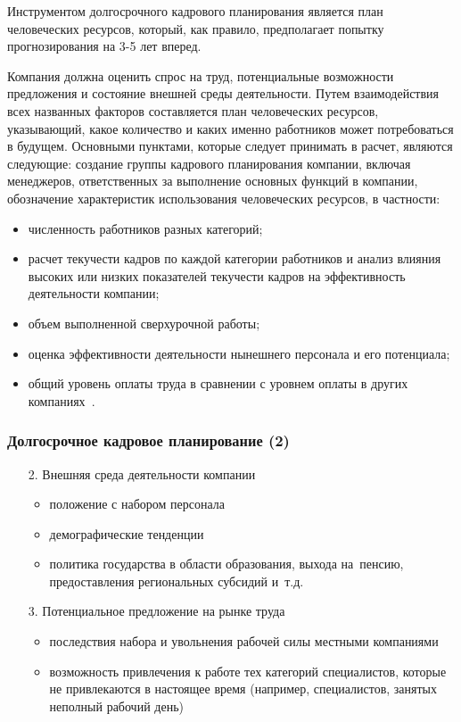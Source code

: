 \documentclass{../industrial-development}
\begin{document}
	\lecturenotes
	
	Инструментом долгосрочного кадрового планирования является план человеческих ресурсов, который, как правило, предполагает попытку прогнозирования на 3-5 лет вперед.
	
	Компания должна оценить спрос на труд, потенциальные возможности предложения и состояние внешней среды деятельности. Путем взаимодействия всех названных факторов составляется план человеческих ресурсов, указывающий, какое количество и
	каких именно работников может потребоваться в будущем. Основными пунктами, которые следует принимать в расчет, являются следующие: создание группы кадрового планирования компании, включая менеджеров, ответственных за выполнение основных функций в компании, обозначение характеристик использования человеческих ресурсов, в частности:
	\begin{itemize}
		\item численность работников разных категорий;
		\item расчет текучести кадров по каждой категории работников и анализ влияния высоких
		или низких показателей текучести кадров на эффективность деятельности компании;
		\item объем выполненной сверхурочной работы;
		\item оценка эффективности деятельности нынешнего персонала и его потенциала;
		\item общий уровень оплаты труда в сравнении с уровнем оплаты в других компаниях~\cite[с.~86]{Ivanova}.
	\end{itemize}
	
	\begin{frame} \frametitle{Долгосрочное кадровое планирование (2)}
		\begin{itemize}
			\item[2.] Внешняя среда деятельности компании
			\begin{itemize}
				\item	положение с набором персонала
				\item	демографические тенденции
				\item политика государства в области образования, выхода на~пенсию, предоставления региональных субсидий и~т.д.
			\end{itemize}
			
			\item[3.] Потенциальное предложение на рынке труда
			\begin{itemize}
				\item последствия набора и увольнения рабочей силы местными компаниями
				\item возможность привлечения к работе тех категорий специалистов, которые не привлекаются в настоящее время (например, специалистов, занятых неполный рабочий день)
			\end{itemize}
		\end{itemize}
	\end{frame}
	
\end{document}
